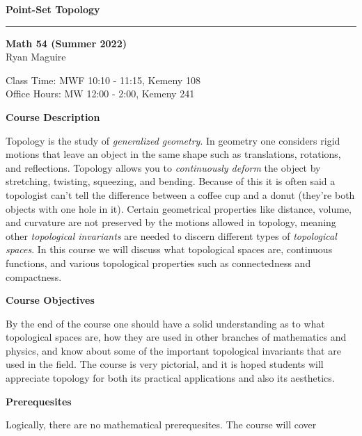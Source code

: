 \documentclass{article}
\begin{document}
    \LARGE
    \textbf{Point-Set Topology}
    \hrule\par\hfill\par
    \normalsize
    \textbf{Math 54 (Summer 2022)}\\
    Ryan Maguire\\
    \color{gray}{Ryan.J.Maguire.GR@dartmouth.edu}
    \par\vspace{0.5cm}
    \color{black}
    Class Time: MWF 10:10 - 11:15, Kemeny 108\\
    Office Hours: MW 12:00 - 2:00, Kemeny 241
    \par\vspace{0.5cm}
    \textbf{Course Description}
    \par\hfill\par
    Topology is the study of \textit{generalized geometry}. In geometry one
    considers rigid motions that leave an object in the same shape such as
    translations, rotations, and reflections. Topology allows you to
    \textit{continuously deform} the object by stretching, twisting, squeezing,
    and bending. Because of this it is often said a topologist can't tell the
    difference between a coffee cup and a donut (they're both objects with
    one hole in it). Certain geometrical properties like distance, volume,
    and curvature are not preserved by the motions allowed in topology,
    meaning other \textit{topological invariants} are needed to discern
    different types of \textit{topological spaces}. In this course we will
    discuss what topological spaces are, continuous functions, and various
    topological properties such as connectedness and compactness.
    \par\hfill\par
    \textbf{Course Objectives}
    \par\hfill\par
    By the end of the course one should have a solid understanding as to what
    topological spaces are, how they are used in other branches of mathematics
    and physics, and know about some of the important topological invariants
    that are used in the field. The course is very pictorial, and it is hoped
    students will appreciate topology for both its practical applications and
    also its aesthetics.
    \par\hfill\par
    \textbf{Prerequesites}
    \par\hfill\par
    Logically, there are no mathematical prerequesites. The course will cover
\end{document}
